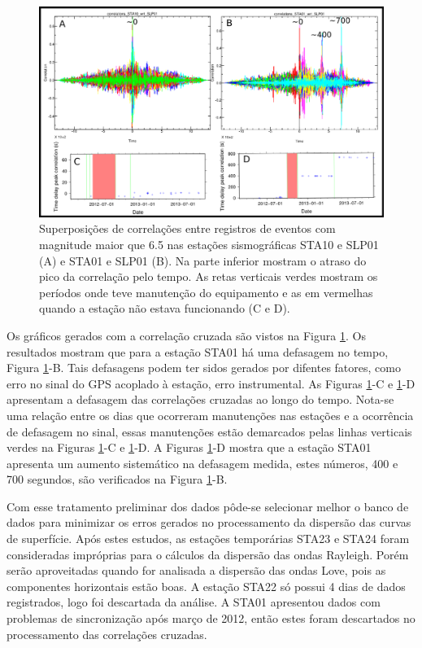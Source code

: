 \begin{figure}[!ht]
\centering
\includegraphics[scale=0.3]{Figs/correlacao_tempo_de_chegada_resultado.png}
\caption[Superposições de correlações entre registros de  eventos com magnitude maior que 6.5 nas estações sismográficas]{Superposições de correlações entre registros de  eventos com magnitude maior que 6.5 nas estações sismográficas STA10 e SLP01 (A) e  STA01 e SLP01 (B). Na parte inferior mostram o atraso do pico da correlação pelo tempo. As retas verticais verdes mostram os períodos onde teve manutenção do equipamento e as em vermelhas quando a estação não estava funcionando (C e D).}
\label{teste_tempo_results}
\end{figure}

Os gráficos gerados com a correlação cruzada são vistos na Figura \ref{teste_tempo_results}. Os resultados mostram que para a estação STA01 há uma defasagem no tempo, Figura \ref{teste_tempo_results}-B. Tais defasagens podem ter sidos gerados por difentes fatores, como erro no sinal do GPS acoplado à estação, erro instrumental. As Figuras \ref{teste_tempo_results}-C e \ref{teste_tempo_results}-D apresentam a defasagem das correlações cruzadas ao longo do tempo. Nota-se uma relação entre os  dias que ocorreram manutenções nas estações  e a ocorrência de defasagem no sinal, essas manutenções estão demarcados pelas linhas verticais verdes na Figuras \ref{teste_tempo_results}-C e \ref{teste_tempo_results}-D. A Figuras \ref{teste_tempo_results}-D mostra que a estação STA01 apresenta um aumento sistemático na defasagem medida, estes números, 400 e 700 segundos, são verificados na Figura \ref{teste_tempo_results}-B.

Com esse tratamento preliminar dos dados pôde-se selecionar melhor o banco de dados para minimizar os erros gerados no processamento da dispersão das curvas de superfície. Após estes estudos, as estações temporárias STA23 e STA24 foram consideradas impróprias para o cálculos da dispersão das ondas Rayleigh. Porém serão aproveitadas quando for analisada a dispersão das ondas Love, pois as componentes horizontais estão boas. A estação STA22 só possui 4 dias de dados registrados, logo foi descartada da análise. A STA01 apresentou dados com problemas de sincronização após março de 2012, então estes foram descartados no processamento das correlações cruzadas.

